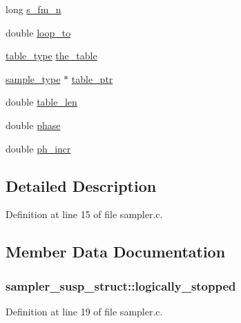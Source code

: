 \begin{DoxyCompactItemize}
\item 
long \hyperlink{structsampler__susp__struct_a631e45b6911f900f9c3a4d1efc8805a2}{s\+\_\+fm\+\_\+n}
\item 
double \hyperlink{structsampler__susp__struct_a1979570b411c3c89712b8c2916164a67}{loop\+\_\+to}
\item 
\hyperlink{sound_8h_a187b856587310160cfd8b383e7377171}{table\+\_\+type} \hyperlink{structsampler__susp__struct_a5c970c7ae84312f2c3b5d6cf688d151b}{the\+\_\+table}
\item 
\hyperlink{sound_8h_a3a9d1d4a1c153390d2401a6e9f71b32c}{sample\+\_\+type} $\ast$ \hyperlink{structsampler__susp__struct_a43f6cf6c4bba56f55111de806d62c623}{table\+\_\+ptr}
\item 
double \hyperlink{structsampler__susp__struct_abe71bed7c41fca0bed5ff4e065704d9a}{table\+\_\+len}
\item 
double \hyperlink{structsampler__susp__struct_a7bca8a7973877b506eb106376e241331}{phase}
\item 
double \hyperlink{structsampler__susp__struct_aad74627b030507500a90d3055f4190d7}{ph\+\_\+incr}
\end{DoxyCompactItemize}


\subsection{Detailed Description}


Definition at line 15 of file sampler.\+c.



\subsection{Member Data Documentation}
\subsubsection[{\texorpdfstring{logically\+\_\+stopped}{logically_stopped}}]{ sampler\+\_\+susp\+\_\+struct\+::logically\+\_\+stopped}\hypertarget{structsampler__susp__struct_a71d994207abacdf2fe2829cfaf7068c7}{}\label{structsampler__susp__struct_a71d994207abacdf2fe2829cfaf7068c7}


Definition at line 19 of file sampler.\+c.

